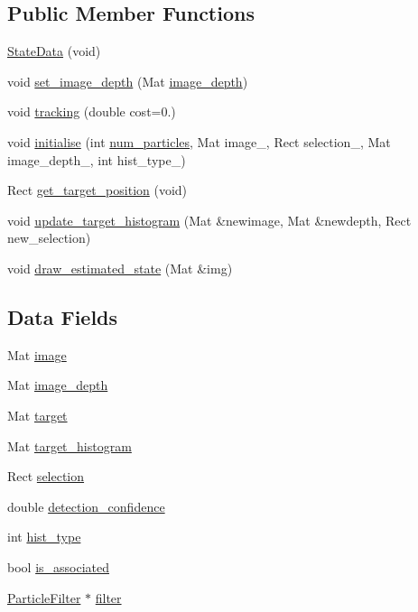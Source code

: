 \subsection*{Public Member Functions}
\begin{DoxyCompactItemize}
\item 
\hyperlink{classStateData_a3bbfa4301403ebf5d24d5d16cf246b88}{State\-Data} (void)
\item 
void \hyperlink{classStateData_a6246f2159937b45b86b85ba0cddbd9c7}{set\-\_\-image\-\_\-depth} (Mat \hyperlink{classStateData_a662c82a423f855845f2be8700af72817}{image\-\_\-depth})
\item 
void \hyperlink{classStateData_af4bbe24b619137cba16b7b85970e1bd7}{tracking} (double cost=0.)
\item 
void \hyperlink{classStateData_a3fe497a97247af50f8eb876d6284da69}{initialise} (int \hyperlink{social__robot_8cpp_acf574bc864f7f0fc111320f1d6c449d5}{num\-\_\-particles}, Mat image\-\_\-, Rect selection\-\_\-, Mat image\-\_\-depth\-\_\-, int hist\-\_\-type\-\_\-)
\item 
Rect \hyperlink{classStateData_aa2c20a09eecd353d4454e707ac17f143}{get\-\_\-target\-\_\-position} (void)
\item 
void \hyperlink{classStateData_a2b26ea86bd2d1d3d37debec000fefa01}{update\-\_\-target\-\_\-histogram} (Mat \&newimage, Mat \&newdepth, Rect new\-\_\-selection)
\item 
void \hyperlink{classStateData_a32b8091aff312aff401b1de0e4685535}{draw\-\_\-estimated\-\_\-state} (Mat \&img)
\end{DoxyCompactItemize}
\subsection*{Data Fields}
\begin{DoxyCompactItemize}
\item 
Mat \hyperlink{classStateData_ab1a1e2be2b9a55c78bc579024d30cf64}{image}
\item 
Mat \hyperlink{classStateData_a662c82a423f855845f2be8700af72817}{image\-\_\-depth}
\item 
Mat \hyperlink{classStateData_ac778c44e62237a225361a80894a48ee8}{target}
\item 
Mat \hyperlink{classStateData_af93e02e6025c07b7a383b2e755f52dca}{target\-\_\-histogram}
\item 
Rect \hyperlink{classStateData_afea0bc5d1743e2db008238bfe9f574ce}{selection}
\item 
double \hyperlink{classStateData_abe87d63070a9fc98cd9f1475495725e6}{detection\-\_\-confidence}
\item 
int \hyperlink{classStateData_a14b4b6d403b4517d7102f49a501d51ed}{hist\-\_\-type}
\item 
bool \hyperlink{classStateData_ad5f3d2a522bfdcff47e7d028bf19f012}{is\-\_\-associated}
\item 
\hyperlink{classParticleFilter}{Particle\-Filter} $\ast$ \hyperlink{classStateData_a42c35fd351a6634b67fd1fd2f5a09cf4}{filter}
\end{DoxyCompactItemize}


